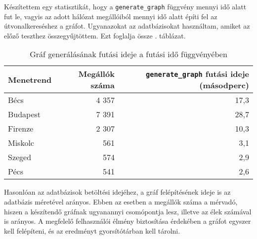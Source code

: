 Készítettem egy statisztikát, hogy a \texttt{generate\_graph} függvény mennyi idő alatt fut le, vagyis az adott hálózat megállóiból mennyi idő alatt építi fel az útvonalkereséshez a gráfot. Ugyanazokat az adatbázisokat használtam, amiket az előző teszthez összegyűjtöttem. Ezt foglalja össze . táblázat.

\begin{table}
\centering
\begin{tabular}{|l|r|r|}
\hline
Menetrend & Megállók száma & \texttt{generate\_graph} futási ideje (másodperc) \\
\hline
Bécs & 4 357 & 17,3 \\
\hline
Budapest & 7 391 & 28,7 \\
\hline
Firenze & 2 307 & 10,3 \\
\hline
Miskolc & 561 & 3,1 \\
\hline
Szeged & 574 & 2,9 \\
\hline
Pécs & 541 & 2,6 \\
\hline
\end{tabular}
\caption{Gráf generálásának futási ideje a futási idő függvényében}
\label{tab:runtime}
\end{table}

Hasonlóan az adatbázisok betöltési idejéhez, a gráf felépítésének ideje is az adatbázis méretével arányos. Ebben az esetben a megállók száma a mérvadó, hiszen a készítendő gráfnak ugyanannyi csomópontja lesz, illetve az élek számával is arányos. A megfelelő felhasználói élmény biztosítása érdekében a gráfot egyszer kell felépíteni, és az eredményt gyorsítótárban kell tárolni.